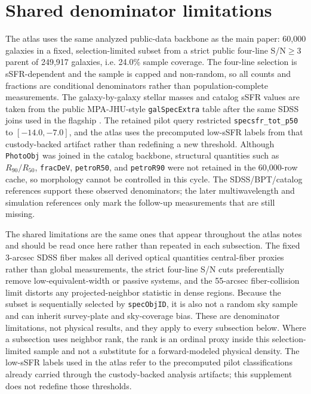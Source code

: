 \documentclass[twocolumn]{aastex631}
\begin{document}
\section{Shared denominator limitations}
The atlas uses the same analyzed public-data backbone as the main paper: 60,000 galaxies in a fixed, selection-limited subset from a strict public four-line S/N$\geq3$ parent of 249,917 galaxies, i.e. 24.0\% sample coverage. The four-line selection is sSFR-dependent and the sample is capped and non-random, so all counts and fractions are conditional denominators rather than population-complete measurements. The galaxy-by-galaxy stellar masses and catalog sSFR values are taken from the public MPA-JHU-style \texttt{galSpecExtra} table after the same SDSS joins used in the flagship \citep{sdssdr17,brinchmann2004,york2000}. The retained pilot query restricted \texttt{specsfr\_tot\_p50} to \([-14.0,-7.0]\), and the atlas uses the precomputed low-sSFR labels from that custody-backed artifact rather than redefining a new threshold. Although \texttt{PhotoObj} was joined in the catalog backbone, structural quantities such as \(R_{90}/R_{50}\), \texttt{fracDeV}, \texttt{petroR50}, and \texttt{petroR90} were not retained in the 60,000-row cache, so morphology cannot be controlled in this cycle. The SDSS/BPT/catalog references support these observed denominators; the later multiwavelength and simulation references only mark the follow-up measurements that are still missing.

The shared limitations are the same ones that appear throughout the atlas notes and should be read once here rather than repeated in each subsection. The fixed 3-arcsec SDSS fiber makes all derived optical quantities central-fiber proxies rather than global measurements, the strict four-line S/N cuts preferentially remove low-equivalent-width or passive systems, and the 55-arcsec fiber-collision limit distorts any projected-neighbor statistic in dense regions. Because the subset is sequentially selected by \texttt{specObjID}, it is also not a random sky sample and can inherit survey-plate and sky-coverage bias. These are denominator limitations, not physical results, and they apply to every subsection below. Where a subsection uses neighbor rank, the rank is an ordinal proxy inside this selection-limited sample and not a substitute for a forward-modeled physical density. The low-sSFR labels used in the atlas refer to the precomputed pilot classifications already carried through the custody-backed analysis artifacts; this supplement does not redefine those thresholds.
\end{document}
